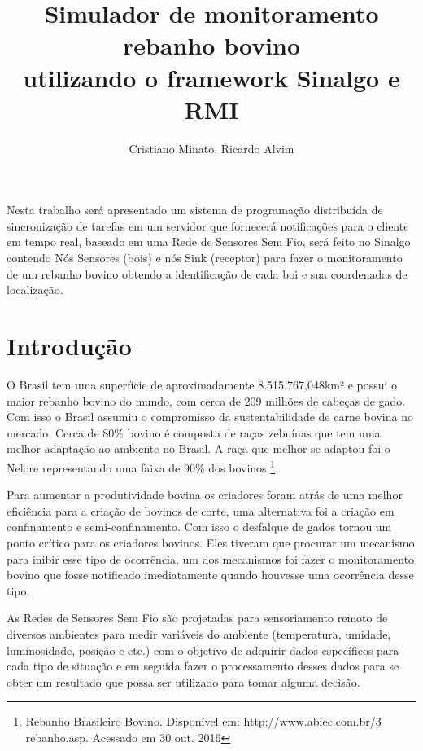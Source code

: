 \documentclass[12pt]{article}
\title{Simulador de monitoramento rebanho bovino \\ utilizando o framework Sinalgo e RMI}
\author{Cristiano Minato\inst{1}, Ricardo Alvim\inst{2} }
\begin{document}
 

\maketitle

     
\begin{resumo} 
Nesta trabalho será apresentado um sistema de programação distribuída de sincronização de tarefas em um servidor que fornecerá notificações para o cliente em tempo real, baseado em uma Rede de Sensores Sem Fio, será feito no Sinalgo contendo Nós Sensores (bois) e nós Sink (receptor) para fazer o monitoramento de um rebanho bovino obtendo a identificação de cada boi e sua coordenadas de localização.

\end{resumo}


\section{Introdução}

O Brasil tem uma superfície de aproximadamente 8.515.767,048km² e possui o maior rebanho bovino do mundo, com cerca de 209 milhões de cabeças de gado. Com isso o Brasil assumiu o compromisso da sustentabilidade de carne bovina no mercado. Cerca de 80$\%$ bovino é composta de raças zebuínas que tem uma melhor adaptação ao ambiente no Brasil. A raça que melhor se adaptou foi o Nelore representando uma faixa de 90$\%$ dos bovinos \footnote{Rebanho Brasileiro Bovino. Disponível em: http://www.abiec.com.br/3\underline{ }rebanho.asp. Acessado em 30 out. 2016}.

Para aumentar a produtividade bovina os criadores foram atrás de uma melhor eficiência para a criação de bovinos de corte, uma alternativa foi a criação em confinamento e semi-confinamento. Com isso o desfalque de gados tornou um ponto crítico para os criadores bovinos. Eles tiveram que procurar um mecanismo para inibir esse tipo de ocorrência, um dos mecanismos foi fazer o monitoramento bovino que fosse notificado imediatamente quando houvesse uma ocorrência desse tipo.

As Redes de Sensores Sem Fio são projetadas para sensoriamento remoto de diversos ambientes para medir variáveis do ambiente (temperatura, umidade, luminosidade, posição e etc.) com o objetivo de adquirir dados específicos para cada tipo de situação e em seguida fazer o processamento desses dados para se obter um resultado que possa ser utilizado para tomar alguma decisão.
\end{document}

